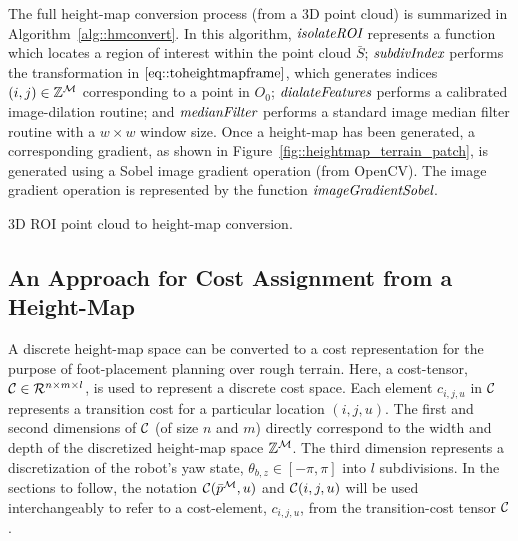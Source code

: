 			The full height-map conversion process (from a 3D point cloud) is summarized in Algorithm~\ref{alg::hmconvert}. In this algorithm, $\emph{\text{isolateROI}}$ represents a function which locates a region of interest within the point cloud $\bar{S}$; $\emph{\text{subdivIndex}}$ performs the transformation in $\ref{eq::toheightmapframe}$, which generates indices $(i,j)\in{\Bbb Z}^{{\cal M}}$ corresponding to a point in $O_{0}$; $\emph{\text{dialateFeatures}}$ performs a calibrated image-dilation routine; and $\emph{\text{medianFilter}}$ performs a standard image median filter routine with a $w\times w$ window size. Once a height-map has been generated, a corresponding gradient, as shown in Figure~\ref{fig::heightmap_terrain_patch}, is generated using a Sobel image gradient operation (from OpenCV). The image gradient operation is represented by the function $\emph{\text{imageGradientSobel}}$.

			\begin{algorithm}[!h]
				\begin{algorithmic}
						\EndIf
					\EndFor
				\end{algorithmic}	
				\caption{3D ROI point cloud to height-map conversion.}
				\label{alg::hmconvert}
			\end{algorithm}






		\subsection{An Approach for Cost Assignment from a Height-Map}

			A discrete height-map space can be converted to a cost representation for the purpose of foot-placement planning over rough terrain. Here, a cost-tensor, ${\cal C}\in{\cal R}^{n\times m\times l}$, is used to represent a discrete cost space. Each element $c_{i,j,u}$ in ${\cal C}$ represents a transition cost for a particular location $(i,j,u)$. The first and second dimensions of ${\cal C}$ (of size $n$ and $m$) directly correspond to the width and depth of the discretized height-map space $\mathbb{Z}^{{\cal M}}$. The third dimension represents a discretization of the robot's yaw state, $\theta_{b,z}\in[-\pi,\pi]$ into $l$ subdivisions.  In the sections to follow, the notation ${\cal C}(\bar{p}^{{\cal M}},u)$ and ${\cal C}(i,j,u)$ will be used interchangeably to refer to a cost-element, $c_{i,j,u}$, from the transition-cost tensor ${\cal C}$.


